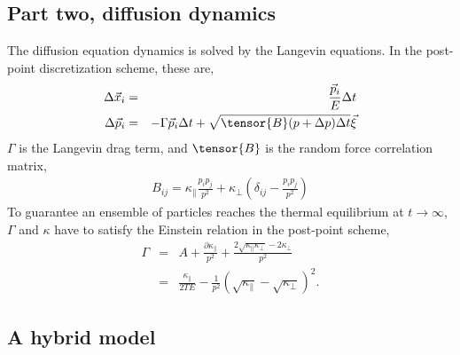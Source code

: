 \documentclass[aps, prc, reprint, amsmath, groupedaddress, nofootinbib]{revtex4-1}
\newcommand{\Kpara}{\kappa_{\|}}
\newcommand{\Kperp}{\kappa_{\perp}}
\begin{document}
\subsection{Part two, diffusion dynamics}
The diffusion equation dynamics is solved by the Langevin equations.
In the post-point discretization scheme, these are,
\begin{eqnarray}
\Delta \vec{x}_i &=& \frac{\vec{p}_i}{E} \Delta t	\\
\Delta \vec{p}_i &=& -\Gamma \vec{p}_i \Delta t + \sqrt{\tensor{B}(p+\Delta p) \Delta t  }\vec{\xi}
\end{eqnarray}
$\Gamma$ is the Langevin drag term, and $\tensor{B}$ is the random force correlation matrix,
\begin{eqnarray}
B_{ij} = \Kpara \frac{p_i p_j}{p^2} + \Kperp \left(\delta_{ij} - \frac{p_i p_j}{p^2}\right)
\end{eqnarray}
To guarantee an ensemble of particles reaches the thermal equilibrium at $t\rightarrow \infty$, $\Gamma$ and $\kappa$ have to satisfy the Einstein relation in the post-point scheme,
\begin{eqnarray}
\Gamma &=& A + \frac{\partial \Kpara}{p^2} + \frac{2\sqrt{\Kpara\Kperp} - 2\Kperp}{p^2} \\
 &=& \frac{\Kpara}{2TE} - \frac{1}{p^2}\left( \sqrt{\Kpara} - \sqrt{\Kperp} \right)^2.
\end{eqnarray}

\subsection{A hybrid model}
\end{document}
